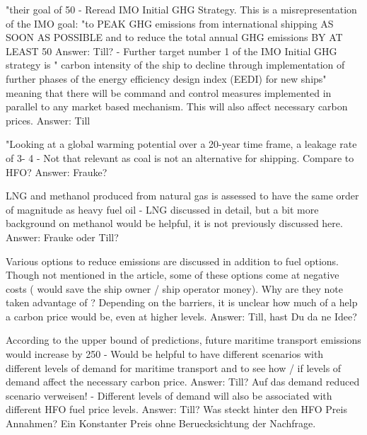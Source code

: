 "their goal of 50%
-	Reread IMO Initial GHG Strategy. This is a misrepresentation of the IMO goal: "to PEAK GHG emissions from international shipping AS SOON AS POSSIBLE and to reduce the total annual GHG emissions BY AT LEAST 50%
Answer: Till?
-	Further target number 1 of the IMO Initial GHG strategy is " carbon intensity of the ship to decline through implementation of further phases of the energy efficiency design index (EEDI) for new ships" meaning that there will be command and control measures implemented in parallel to any market based mechanism. This will also affect necessary carbon prices. 
Answer: Till

"Looking at a global warming potential over a 20-year time frame, a leakage rate of 3- 4 %
-	Not that relevant as coal is not an alternative for shipping. Compare to HFO?
Answer: Frauke?

LNG and methanol produced from natural gas is assessed to have the same order of magnitude as heavy fuel oil
-	LNG discussed in detail, but a bit more background on methanol would be helpful, it is not previously discussed here.
Answer: Frauke oder Till?

Various options to reduce emissions are discussed in addition to fuel options. Though not mentioned in the article, some of these options come at negative costs ( would save the ship owner / ship operator money). Why are they note taken advantage of ? Depending on the barriers, it is unclear how much of a help a carbon price would be, even at higher levels.
Answer: Till, hast Du da ne Idee?
 
According to the upper bound of predictions, future maritime transport emissions would increase by 250%
-	Would be helpful to have different scenarios with different levels of demand for maritime transport and to see how / if levels of demand affect the necessary carbon price.
Answer: Till? Auf das demand reduced scenario verweisen!
-	Different levels of demand will also be associated with different HFO fuel price levels.
Answer: Till? Was steckt hinter den HFO Preis Annahmen? Ein Konstanter Preis ohne Beruecksichtung der Nachfrage.

